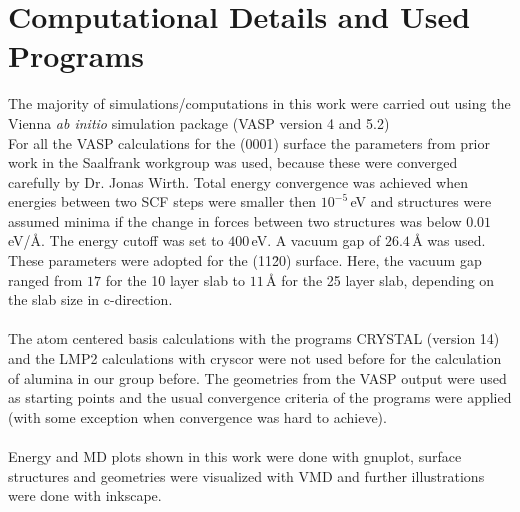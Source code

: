 \documentclass[11pt,DIV=13,BCOR=5mm,a4paper,headinclude]{scrbook}
\begin{document}
\section{Computational Details and Used Programs}
The majority of simulations/computations in this work were carried out using the Vienna \textit{ab initio} simulation package (VASP version 4 and 5.2)\cite{kresse1993,kresse2,kresse3,kresse4,kresse99}
\\
For all the VASP calculations for the (0001) surface the parameters from prior work in the Saalfrank workgroup was used, because these were converged carefully by Dr. Jonas Wirth\cite{WirthJPCC2012,Wirth2014,Wirth2015,Wirth2016}.
Total energy convergence was achieved when energies between two SCF steps were smaller then $10^{-5}\,$eV and structures were assumed minima if the change in forces between two structures was below $0.01\,$eV/\AA{}.
The energy cutoff was set to $400\,$eV.
A vacuum gap of $26.4\,$\AA{} was used.
\\
These parameters were adopted for the (11\=20) surface.
Here, the vacuum gap ranged from $17$ for the 10 layer slab to $11\,$\AA{} for the 25 layer slab, depending on the slab size in c-direction.
\\\\
The atom centered basis calculations with the programs CRYSTAL\cite{crystal14} (version 14) and the LMP2 calculations with cryscor\cite{cryscor} were not used before for the calculation of alumina in our group before.
The geometries from the VASP output were used as starting points and the usual convergence criteria of the programs were applied (with some exception when convergence was hard to achieve).
\\\\
Energy and MD plots shown in this work were done with gnuplot\cite{gnuplot}, surface structures and geometries were visualized with VMD\cite{vmd} and further illustrations were done with inkscape\cite{inkscape}.
\end{document}
